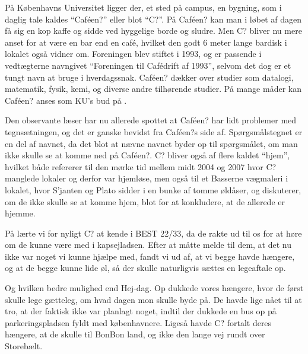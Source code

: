 På Københavns Universitet ligger der, et sted på campus, en bygning, som i daglig tale kaldes ``Caféen?'' eller blot ``C?''. På Caféen? kan man i løbet af dagen få sig en kop kaffe og sidde ved hyggelige borde og sludre. Men C? bliver nu mere anset for at være en bar end en café, hvilket den godt 6 meter lange bardisk i lokalet også vidner om.
Foreningen blev stiftet i 1993, og er passende i vedtægterne navngivet ``Foreningen til Cafédrift af 1993'', selvom det dog er et tungt navn at bruge i hverdagssnak. Caféen? dækker over studier som datalogi, matematik, fysik, kemi, og diverse andre tilhørende studier.
På mange måder kan Caféen? anses som KU's bud på \TKET.

Den observante læser har nu allerede spottet at Caféen? har lidt problemer med tegnsætningen, og det er ganske bevidst fra Caféen?s side af. Spørgsmålstegnet er en del af navnet, da det blot at nævne navnet byder op til spørgsmålet, om man ikke skulle se at komme ned på Caféen?.
C? bliver også af flere kaldet ``hjem'', hvilket både refererer til den mørke tid mellem midt 2004 og 2007 hvor C? manglede lokaler og derfor var hjemløse, men også til et Basserne vægmaleri i lokalet, hvor S'janten og Plato sidder i en bunke af tomme øldåser, og diskuterer, om de ikke skulle se at komme hjem, blot for at konkludere, at de allerede er hjemme.

På \TKET lærte vi for nyligt C? at kende i BEST 22/33, da de rakte ud til os for at høre om de kunne være med i kapsejladsen. Efter at måtte melde til dem, at det nu ikke var noget vi kunne hjælpe med, fandt vi ud af, at vi begge havde hængere, og at de begge kunne lide øl, så der skulle naturligvis sættes en legeaftale op.


Og hvilken bedre mulighed end Hej-dag. Op dukkede vores hængere, hvor de først skulle lege gætteleg, om hvad dagen mon skulle byde på. De havde lige nået til at tro, at der faktisk ikke var planlagt noget, indtil der dukkede en bus op på parkeringspladsen fyldt med københavnere. Ligeså havde C? fortalt deres hængere, at de skulle til BonBon land, og ikke den lange vej rundt over Storebælt.



